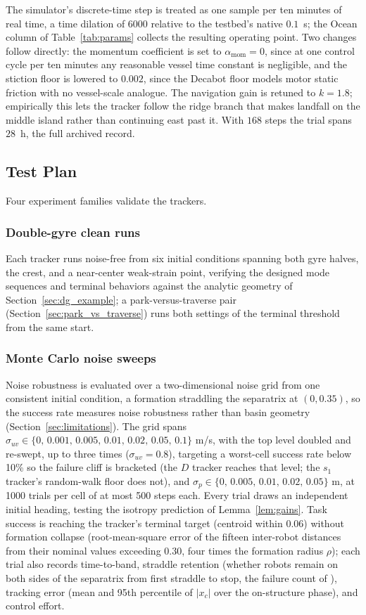 \documentclass[lettersize,journal]{IEEEtran}
\begin{document}
The simulator's discrete-time step is treated as one sample per ten
minutes of real time, a time dilation of 6000 relative to the testbed's
native $0.1$~s; the Ocean column of Table~\ref{tab:params} collects
the resulting operating point. Two changes follow directly: the
momentum coefficient is set to $\alpha_{\text{mom}} = 0$, since at one
control cycle per ten minutes any reasonable vessel time constant is
negligible, and the stiction floor is lowered to $0.002$, since the
Decabot floor models motor static friction with no vessel-scale
analogue. The navigation gain is retuned to $k = 1.8$; empirically this
lets the tracker follow the ridge branch that makes landfall on the
middle island rather than continuing east past it. With $168$ steps the
trial spans $28$~h, the full archived record.

\subsection{Test Plan}
\label{sec:test_plan}

Four experiment families validate the trackers.

\subsubsection{Double-gyre clean runs}
Each tracker runs noise-free from six initial conditions spanning both
gyre halves, the crest, and a near-center weak-strain point, verifying
the designed mode sequences and terminal behaviors against the analytic
geometry of Section~\ref{sec:dg_example}; a park-versus-traverse pair
(Section~\ref{sec:park_vs_traverse}) runs both settings of the terminal
threshold from the same start.

\subsubsection{Monte Carlo noise sweeps}
Noise robustness is evaluated over a two-dimensional noise grid from
one consistent initial condition, a formation straddling the separatrix
at $(0, 0.35)$, so the success rate measures noise robustness rather
than basin geometry (Section~\ref{sec:limitations}). The grid spans $\sigma_{uv} \in \{0,\,
0.001,\, 0.005,\, 0.01,\, 0.02,\, 0.05,\, 0.1\}$ m/s, with the top
level doubled and re-swept, up to three times ($\sigma_{uv} = 0.8$),
targeting a worst-cell success rate below 10\% so the failure cliff is
bracketed (the $D$ tracker reaches that level; the $s_1$ tracker's
random-walk floor does not), and $\sigma_p \in
\{0,\, 0.005,\, 0.01,\, 0.02,\, 0.05\}$ m, at 1000 trials per cell of
at most 500 steps each. Every trial draws an independent initial
heading, testing the isotropy prediction of Lemma~\ref{lem:gains}.
Task success is reaching the tracker's terminal target (centroid
within 0.06) without formation collapse (root-mean-square error of the
fifteen inter-robot distances from their nominal values exceeding
0.30, four times the formation radius $\rho$); each trial also
records time-to-band, straddle retention (whether robots remain on
both sides of the separatrix from first straddle to stop, the failure
count of \cite{9}), tracking error (mean and 95th percentile of
$|x_c|$ over the on-structure phase), and control effort.
\end{document}

